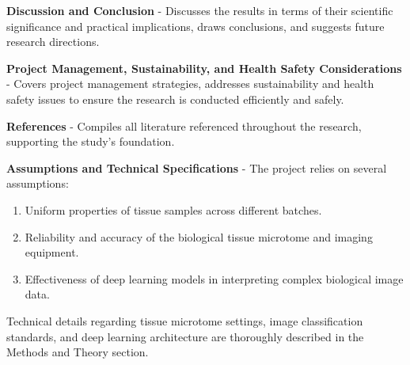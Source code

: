 \textbf{Discussion and Conclusion} - Discusses the results in terms of their scientific significance and practical implications, draws conclusions, and suggests future research directions.

\textbf{Project Management, Sustainability, and Health Safety Considerations} - Covers project management strategies, addresses sustainability and health safety issues to ensure the research is conducted efficiently and safely.

\textbf{References} - Compiles all literature referenced throughout the research, supporting the study's foundation.


\textbf{Assumptions and Technical Specifications} - The project relies on several assumptions:

\begin{enumerate}
    \item Uniform properties of tissue samples across different batches.
    \item Reliability and accuracy of the biological tissue microtome and imaging equipment.
    \item Effectiveness of deep learning models in interpreting complex biological image data.
\end{enumerate}

Technical details regarding tissue microtome settings, image classification standards, and deep learning architecture are thoroughly described in the Methods and Theory section.
